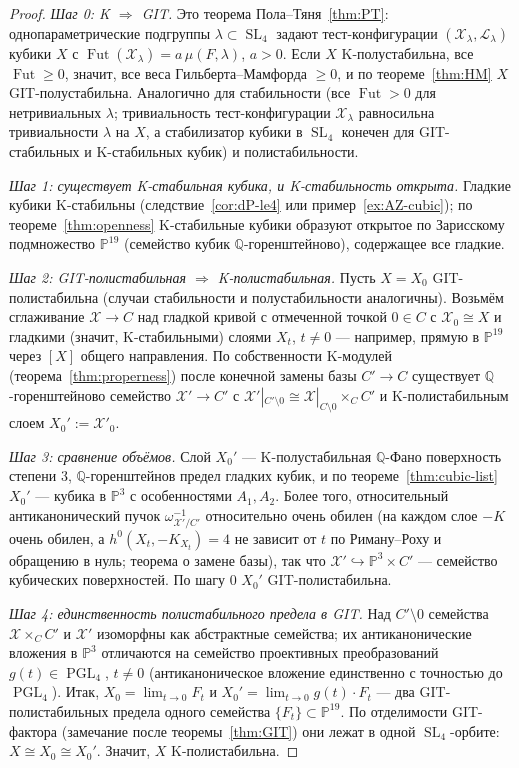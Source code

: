 \documentclass[11pt,a4paper]{article}
\theoremstyle{plain}
\theoremstyle{definition}
\theoremstyle{remark}
\newcommand{\Q}{\mathbb{Q}}
\newcommand{\PP}{\mathbb{P}}
\newcommand{\cL}{\mathcal{L}}
\newcommand{\cX}{\mathcal{X}}
\DeclareMathOperator{\SL}{SL}
\DeclareMathOperator{\PGL}{PGL}
\DeclareMathOperator{\Fut}{Fut}
\begin{document}
\begin{proof}
\emph{Шаг 0: K $\Rightarrow$ GIT.} Это теорема Пола--Тяня~\ref{thm:PT}: однопараметрические подгруппы
$\lambda\subset\SL_4$ задают тест-конфигурации $(\cX_\lambda,\cL_\lambda)$ кубики $X$ с
$\Fut(\cX_\lambda)=a\,\mu(F,\lambda)$, $a>0$. Если $X$ K-полустабильна, все $\Fut\ge0$, значит, все
веса Гильберта--Мамфорда $\ge0$, и по теореме~\ref{thm:HM} $X$ GIT-полустабильна. Аналогично для
стабильности (все $\Fut>0$ для нетривиальных $\lambda$; тривиальность тест-конфигурации
$\cX_\lambda$ равносильна тривиальности $\lambda$ на $X$, а стабилизатор кубики в $\SL_4$
конечен для GIT-стабильных и K-стабильных кубик) и полистабильности.

\emph{Шаг 1: существует K-стабильная кубика, и K-стабильность открыта.} Гладкие кубики K-стабильны
(следствие~\ref{cor:dP-le4} или пример~\ref{ex:AZ-cubic}); по теореме~\ref{thm:openness}
K-стабильные кубики образуют открытое по Зарисскому подмножество $\PP^{19}$ (семейство кубик
$\Q$-горенштейново), содержащее все гладкие.

\emph{Шаг 2: GIT-полистабильная $\Rightarrow$ K-полистабильная.} Пусть $X=X_0$ GIT-полистабильна
(случаи стабильности и полустабильности аналогичны). Возьмём сглаживание $\cX\to C$ над гладкой
кривой с отмеченной точкой $0\in C$ с $\cX_0\cong X$ и гладкими (значит, K-стабильными) слоями $X_t$,
$t\ne0$ --- например, прямую в $\PP^{19}$ через $[X]$ общего направления. По собственности K-модулей
(теорема~\ref{thm:properness}) после конечной замены базы $C'\to C$ существует $\Q$-горенштейново
семейство $\cX'\to C'$ с $\cX'|_{C'\setminus0}\cong\cX|_{C\setminus0}\times_CC'$ и K-полистабильным
слоем $X_0':=\cX'_0$.

\emph{Шаг 3: сравнение объёмов.} Слой $X_0'$ --- K-полустабильная $\Q$-Фано поверхность степени 3,
$\Q$-горенштейнов предел гладких кубик, и по теореме~\ref{thm:cubic-list} $X_0'$ --- кубика в
$\PP^3$ с особенностями $A_1,A_2$. Более того, относительный антиканонический пучок
$\omega_{\cX'/C'}^{-1}$ относительно очень обилен (на каждом слое $-K$ очень обилен, а
$h^0(X_t,-K_{X_t})=4$ не зависит от $t$ по Риману--Роху и обращению в нуль; теорема о замене базы),
так что $\cX'\hookrightarrow\PP^3\times C'$ --- семейство кубических поверхностей. По шагу 0
$X_0'$ GIT-полистабильна.

\emph{Шаг 4: единственность полистабильного предела в GIT.} Над $C'\setminus0$ семейства
$\cX\times_CC'$ и $\cX'$ изоморфны как абстрактные семейства; их антиканонические вложения в $\PP^3$
отличаются на семейство проективных преобразований $g(t)\in\PGL_4$, $t\ne0$ (антиканоническое
вложение единственно с точностью до $\PGL_4$). Итак, $X_0=\lim_{t\to0}F_t$ и
$X_0'=\lim_{t\to0}g(t)\cdot F_t$ --- два GIT-полистабильных предела одного семейства
$\{F_t\}\subset\PP^{19}$. По отделимости GIT-фактора (замечание после теоремы~\ref{thm:GIT})
они лежат в одной $\SL_4$-орбите: $X\cong X_0\cong X_0'$. Значит, $X$ K-полистабильна.
\end{proof}
\end{document}
